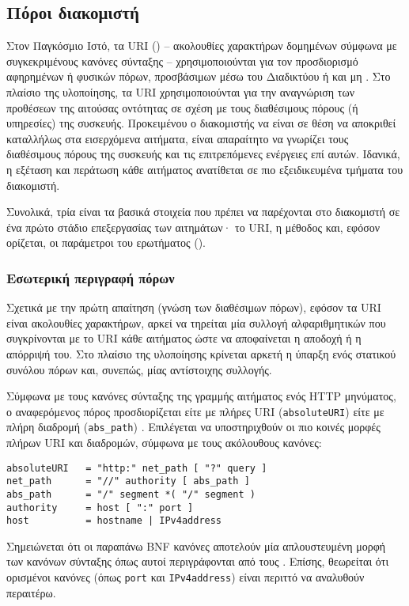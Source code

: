 



\subsection{Πόροι διακομιστή}
\label{subsec:network:resource}

Στον Παγκόσμιο Ιστό, τα URI () -- ακολουθίες
χαρακτήρων δομημένων σύμφωνα με συγκεκριμένους κανόνες σύνταξης --
χρησιμοποιούνται για τον προσδιορισμό αφηρημένων ή φυσικών πόρων, προσβάσιμων
μέσω του Διαδικτύου ή και μη \parencite[1,5]{rfc3986}.
Στο πλαίσιο της υλοποίησης, τα URI χρησιμοποιούνται για την αναγνώριση των
προθέσεων της αιτούσας οντότητας σε σχέση με τους διαθέσιμους πόρους (ή
υπηρεσίες) της συσκευής. Προκειμένου ο διακομιστής να είναι σε θέση να αποκριθεί
καταλλήλως στα εισερχόμενα αιτήματα, είναι απαραίτητο να γνωρίζει τους
διαθέσιμους πόρους της συσκευής και τις επιτρεπόμενες ενέργειες επί αυτών.
Ιδανικά, η εξέταση και περάτωση κάθε αιτήματος ανατίθεται σε πιο εξειδικευμένα
τμήματα του διακομιστή.

Συνολικά, τρία είναι τα βασικά στοιχεία που πρέπει να παρέχονται στο διακομιστή
σε ένα πρώτο στάδιο επεξεργασίας των αιτημάτων· το URI, η μέθοδος και, εφόσον
ορίζεται, οι παράμετροι του ερωτήματος ().

\subsubsection{Εσωτερική περιγραφή πόρων}
\label{ssubsec:network:resource-general}

Σχετικά με την πρώτη απαίτηση (γνώση των διαθέσιμων πόρων),
εφόσον τα URI είναι ακολουθίες χαρακτήρων, αρκεί να τηρείται μία συλλογή
αλφαριθμητικών που συγκρίνονται με το URI κάθε αιτήματος ώστε να αποφαίνεται η
αποδοχή ή η απόρριψή του. Στο πλαίσιο της υλοποίησης κρίνεται αρκετή η ύπαρξη
ενός στατικού συνόλου πόρων και, συνεπώς, μίας αντίστοιχης συλλογής.

Σύμφωνα με τους κανόνες σύνταξης της γραμμής αιτήματος ενός HTTP μηνύματος, ο
αναφερόμενος πόρος προσδιορίζεται είτε με πλήρες URI (\verb~absoluteURI~) είτε
με πλήρη διαδρομή (\verb~abs_path~) \parencite[36--37]{rfc2616}.
Επιλέγεται να υποστηριχθούν οι πιο κοινές μορφές πλήρων URI και διαδρομών,
σύμφωνα με τους ακόλουθους κανόνες:
\begin{lstlisting}
absoluteURI   = "http:" net_path [ "?" query ]
net_path      = "//" authority [ abs_path ]
abs_path      = "/" segment *( "/" segment )
authority     = host [ ":" port ]
host          = hostname | IPv4address
\end{lstlisting}
Σημειώνεται ότι οι παραπάνω BNF κανόνες αποτελούν μία απλουστευμένη μορφή των
κανόνων σύνταξης όπως αυτοί περιγράφονται από τους
\textcite[11--12,27--28]{rfc2396}.
Επίσης, θεωρείται ότι ορισμένοι κανόνες (όπως \verb~port~ και 
\verb~IPv4address~) είναι περιττό να αναλυθούν περαιτέρω.

